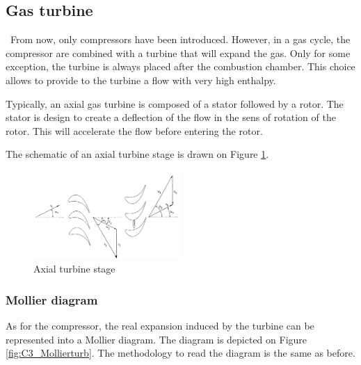 \subsection{Gas turbine}
\quad\, From now, only compressors have been introduced. However, in a gas cycle, the compressor are combined with a turbine that will expand the gas. Only for some exception, the turbine is always placed after the combustion chamber. This choice allows to provide to the turbine a flow with very high enthalpy.

Typically, an axial gas turbine is composed of a stator followed by a rotor. The stator is design to create a deflection of the flow in the sens of rotation of the rotor. This will accelerate the flow before entering the rotor.

The schematic of an axial turbine stage is drawn on Figure \ref{fig:C3_turbstage}.
\begin{figure}[h]
\centering
\includegraphics[width=0.5\textwidth]{Turb_stage.png}
\caption{Axial turbine stage \citep{Hillewaert2019}}
\label{fig:C3_turbstage}
\end{figure}

\subsubsection{Mollier diagram}
As for the compressor, the real expansion induced by the turbine can be represented into a Mollier diagram. The diagram is depicted on Figure \ref{fig:C3_Mollierturb}. The methodology to read the diagram is the same as before.


